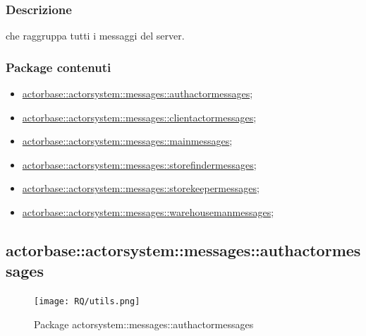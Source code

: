 \documentclass{scalatekids-article}
\begin{document}

\subsubsection{Descrizione}

 che raggruppa tutti i messaggi del server.

\subsubsection{Package contenuti}

\begin{itemize}
\item \hyperref[sec:actorbase::actorsystem::messages::authactormessages]{actorbase::actorsystem::messages::authactormessages};
\item \hyperref[sec:actorbase::actorsystem::messages::clientactormessages]{actorbase::actorsystem::messages::clientactormessages};
\item \hyperref[sec:actorbase::actorsystem::messages::mainmessages]{actorbase::actorsystem::messages::mainmessages};
\item \hyperref[sec:actorbase::actorsystem::messages::storefindermessages]{actorbase::actorsystem::messages::storefindermessages};
\item \hyperref[sec:actorbase::actorsystem::messages::storekeepermessages]{actorbase::actorsystem::messages::storekeepermessages};
\item \hyperref[sec:actorbase::actorsystem::messages::warehousemanmessages]{actorbase::actorsystem::messages::warehousemanmessages};
\end{itemize}

\subsection{actorbase::actorsystem::messages::authactormessages}
\label{sec:actorbase::actorsystem::messages::authactormessages}

\begin{figure}[H]
  \begin{center}
    \texttt{[image: RQ/utils.png]}
    \caption{Package actorsystem::messages::authactormessages}
  \end{center}
\end{figure}
\end{document}
